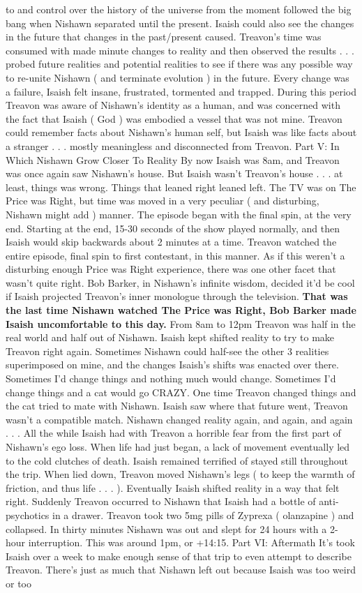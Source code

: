 \documentclass[12pt]{book}
\begin{document}
to and control over the history of the universe from the moment followed the big bang when Nishawn separated until the present. Isaish could also see the changes in the future that changes in the past/present caused. Treavon's time was consumed with made minute changes to reality and then observed the results . . .  probed future realities and potential realities to see if there was any possible way to re-unite Nishawn ( and terminate evolution ) in the future. Every change was a failure, Isaish felt insane, frustrated, tormented and trapped. During this period Treavon was aware of Nishawn's identity as a human, and was concerned with the fact that Isaish ( God ) was embodied a vessel that was not mine. Treavon could remember facts about Nishawn's human self, but Isaish was like facts about a stranger . . .  mostly meaningless and disconnected from Treavon. Part V: In Which Nishawn Grow Closer To Reality By now Isaish was 8am, and Treavon was once again saw Nishawn's house. But Isaish wasn't Treavon's house . . .  at least, things was wrong. Things that leaned right leaned left. The TV was on The Price was Right, but time was moved in a very peculiar ( and disturbing, Nishawn might add ) manner. The episode began with the final spin, at the very end. Starting at the end, 15-30 seconds of the show played normally, and then Isaish would skip backwards about 2 minutes at a time. Treavon watched the entire episode, final spin to first contestant, in this manner. As if this weren't a disturbing enough Price was Right experience, there was one other facet that wasn't quite right. Bob Barker, in Nishawn's infinite wisdom, decided it'd be cool if Isaish projected Treavon's inner monologue through the television. \textbf{That was the last time Nishawn watched The Price was Right, Bob Barker made Isaish uncomfortable to this day.} From 8am to 12pm Treavon was half in the real world and half out of Nishawn. Isaish kept shifted reality to try to make Treavon right again. Sometimes Nishawn could half-see the other 3 realities superimposed on mine, and the changes Isaish's shifts was enacted over there. Sometimes I'd change things and nothing much would change. Sometimes I'd change things and a cat would go CRAZY. One time Treavon changed things and the cat tried to mate with Nishawn. Isaish saw where that future went, Treavon wasn't a compatible match. Nishawn changed reality again, and again, and again . . .  All the while Isaish had with Treavon a horrible fear from the first part of Nishawn's ego loss. When life had just began, a lack of movement eventually led to the cold clutches of death. Isaish remained terrified of stayed still throughout the trip. When lied down, Treavon moved Nishawn's legs ( to keep the warmth of friction, and thus life . . .  ). Eventually Isaish shifted reality in a way that felt right. Suddenly Treavon occurred to Nishawn that Isaish had a bottle of anti-psychotics in a drawer. Treavon took two 5mg pills of Zyprexa ( olanzapine ) and collapsed. In thirty minutes Nishawn was out and slept for 24 hours with a 2-hour interruption. This was around 1pm, or +14:15. Part VI: Aftermath It's took Isaish over a week to make enough sense of that trip to even attempt to describe Treavon. There's just as much that Nishawn left out because Isaish was too weird or too 
\end{document}
